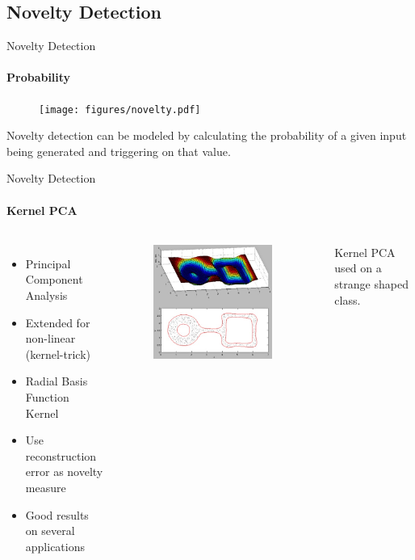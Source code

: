\documentclass[compress]{beamer}
\begin{document}
\subsection{Novelty Detection}
\begin{frame}{Novelty Detection}
\framesubtitle{Probability}
    \begin{figure}
        \texttt{[image: figures/novelty.pdf]}
    \end{figure}
    Novelty detection can be modeled by calculating the probability of a given input being generated and triggering on that value\cite{bishop1994novelty}.
\end{frame}

\begin{frame}{Novelty Detection}
\framesubtitle{Kernel PCA}
    \begin{columns}[t]
        \begin{itemize}
        \item Principal Component Analysis
        \item Extended for non-linear (kernel-trick)
        \item Radial Basis Function Kernel
        \item Use reconstruction error as novelty measure
        \item Good results on several applications
        \end{itemize}
    \begin{figure}
        \includegraphics[width=0.9\textwidth]{figures/ringlinesquare_kpca.jpg}
    \end{figure}
        Kernel PCA used on a strange shaped class\cite{Hoffmann2007863}.
    \end{columns}
\end{frame}
\end{document}
